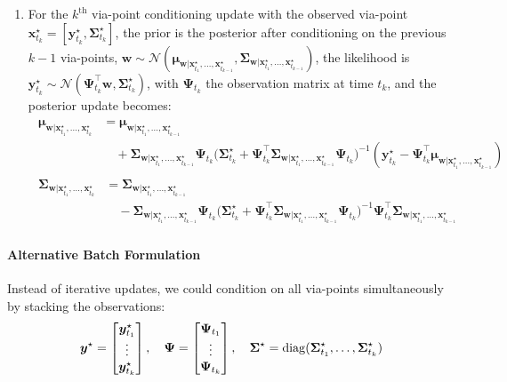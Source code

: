 \documentclass{article}
\begin{document}
\begin{enumerate}
\item For the $k^{\text{th}}$ via-point conditioning update with the observed via-point $\bm{x}_{t_{k}}^\star = [\bm{y}_{t_{k}}^\star, \bm{\Sigma}^\star_{t_{k}}]$, the prior is the posterior after conditioning on the previous $k-1$ via-points, \ie{} $\bm{w} \sim \mathcal{N}(\bm{\mu}_{\bm{w}|\bm{x}_{t_{1}}^\star, \dots, \bm{x}_{t_{k-1}}^\star}, \allowbreak \bm{\Sigma}_{\bm{w}|\bm{x}_{t_{1}}^\star, \dots, \bm{x}_{t_{k-1}}^\star})$, the likelihood is $\bm{y}_{t_{k}}^\star \sim \mathcal{N}(\bm{\Psi}_{t_k}^\top \bm{w}, \bm{\Sigma}_{t_{k}}^\star)$, with $\bm{\Psi}_{t_k}$ the observation matrix at time $t_{k}$, and the posterior update becomes:
\begin{align}
\begin{split}
\bm{\mu}_{\bm{w}|\bm{x}_{t_{1}}^\star, \dots, \bm{x}_{t_{k}}^\star} &= \bm{\mu}_{\bm{w}|\bm{x}_{t_{1}}^\star, \dots, \bm{x}_{t_{k-1}}^\star} \\&\quad+ \bm{\Sigma}_{\bm{w}|\bm{x}_{t_{1}}^\star, \dots, \bm{x}_{t_{k-1}}^\star}\bm{\Psi}_{t_k} \Big(\bm{\Sigma}_{t_{k}}^\star + \bm{\Psi}_{t_k}^\top \bm{\Sigma}_{\bm{w}|\bm{x}_{t_{1}}^\star, \dots, \bm{x}_{t_{k-1}}^\star}\bm{\Psi}_{t_k} \Big)^{-1} (\bm{y}_{t_{k}}^\star - \bm{\Psi}_{t_k}^\top \bm{\mu}_{\bm{w}|\bm{x}_{t_{1}}^\star, \dots, \bm{x}_{t_{k-1}}^\star})
\end{split}\\
\begin{split}
\bm{\Sigma}_{\bm{w}|\bm{x}_{t_{1}}^\star, \dots, \bm{x}_{t_{k}}^\star} &= \bm{\Sigma}_{\bm{w}|\bm{x}_{t_{1}}^\star, \dots, \bm{x}_{t_{k-1}}^\star} \\&\quad- \bm{\Sigma}_{\bm{w}|\bm{x}_{t_{1}}^\star, \dots, \bm{x}_{t_{k-1}}^\star}\bm{\Psi}_{t_k} \Big(\bm{\Sigma}_{t_{k}}^\star +  \bm{\Psi}_{t_k}^\top \bm{\Sigma}_{\bm{w}|\bm{x}_{t_{1}}^\star, \dots, \bm{x}_{t_{k-1}}^\star}\bm{\Psi}_{t_k} \Big)^{-1} \bm{\Psi}_{t_k}^\top \bm{\Sigma}_{\bm{w}|\bm{x}_{t_{1}}^\star, \dots, \bm{x}_{t_{k-1}}^\star}
\end{split}
\end{align}
\end{enumerate}

\paragraph{Alternative Batch Formulation}
Instead of iterative updates, we could condition on all via-points simultaneously by stacking the observations:
\begin{equation}
  \bm{y}^{\star} =
  \begin{bmatrix}
    \bm{y}^{\star}_{t_{1}}\\
    \vdots \\
    \bm{y}^{\star}_{t_{k}}
  \end{bmatrix}, \quad
  \bm{\Psi} =
  \begin{bmatrix}
    \bm{\Psi}_{t_{1}}\\
    \vdots \\
    \bm{\Psi}_{t_{k}}
  \end{bmatrix}, \quad
  \bm{\Sigma}^\star = \operatorname{diag}(\bm{\Sigma}^\star_{t_{1}}, \dots, \bm{\Sigma}^\star_{t_{k}})
\end{equation}
\end{document}
